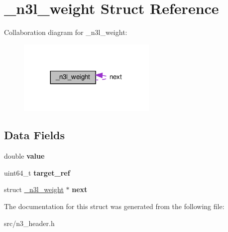 \hypertarget{struct__n3l__weight}{}\section{\+\_\+n3l\+\_\+weight Struct Reference}
\label{struct__n3l__weight}


Collaboration diagram for \+\_\+n3l\+\_\+weight\+:\nopagebreak
\begin{figure}[H]
\begin{center}
\leavevmode
\includegraphics[width=188pt]{struct__n3l__weight__coll__graph}
\end{center}
\end{figure}
\subsection*{Data Fields}
\begin{DoxyCompactItemize}
\item 
\mbox{\label{struct__n3l__weight_a1d1ebc5e04ba1dd26094993dd94aa710}} 
double {\bfseries value}
\item 
\mbox{\label{struct__n3l__weight_ac5094b52f09a092ffb1cdc4cc594f38f}} 
uint64\+\_\+t {\bfseries target\+\_\+ref}
\item 
\mbox{\label{struct__n3l__weight_adf96faae4820538377678c82ec96d48e}} 
struct \mbox{\hyperlink{struct__n3l__weight}{\+\_\+n3l\+\_\+weight}} $\ast$ {\bfseries next}
\end{DoxyCompactItemize}


The documentation for this struct was generated from the following file\+:\begin{DoxyCompactItemize}
\item 
src/n3\+\_\+header.\+h\end{DoxyCompactItemize}
